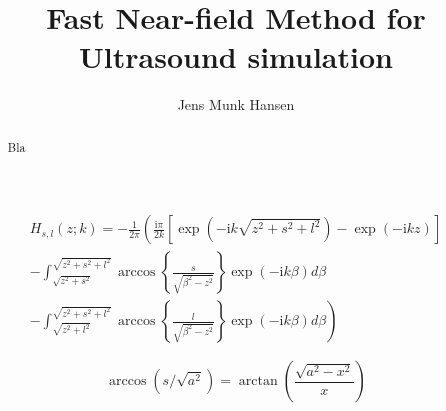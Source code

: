\documentclass[a4paper]{article}
\title{Fast Near-field Method for Ultrasound simulation} %
\author{Jens Munk Hansen}
\begin{document}
\maketitle

\thispagestyle{empty}


\begin{abstract}
Bla
\end{abstract}

\begin{gather}
H_{s,l}(z;k) =
-\frac{1}{2\pi} \left(\frac{\mathrm{i}\pi}{2k}\left[\exp{(-\mathrm{i}k\sqrt{z^2+s^2+l^2})}-\exp{(-\mathrm{i}kz)}
  \right] \right.\nonumber\\
\left.-\int_{\sqrt{z^2+s^2}}^{\sqrt{z^2+s^2+l^2}}
  \arccos{\left\{\frac{s}{\sqrt{\beta^2-z^2}}\right\}}\exp{(-\mathrm{i}k\beta)}d\beta
\right.\nonumber\\
\left.-\int_{\sqrt{z^2+l^2}}^{\sqrt{z^2+s^2+l^2}}
  \arccos{\left\{\frac{l}{\sqrt{\beta^2-z^2}}\right\}}\exp{(-\mathrm{i}k\beta)}d\beta
\right)
\end{gather}

\begin{equation}
\arccos{(s/\sqrt{a^2})}=\arctan{\left(\frac{\sqrt{a^2-x^2}}{x}\right)}
\end{equation}


\end{document}
